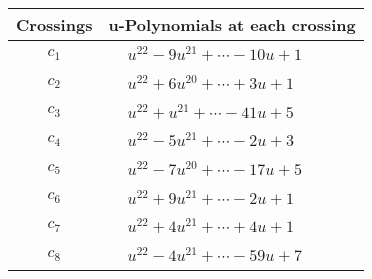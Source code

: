 \documentclass[1p]{elsarticle_modified}
\theoremstyle{definition}
\begin{document}
\begin{tabular}{m{50pt}|m{274pt}}
Crossings & \hspace{64pt}u-Polynomials at each crossing \\
\hline $$\begin{aligned}c_{1}\end{aligned}$$&$\begin{aligned}
&u^{22}-9 u^{21}+\cdots-10 u+1
\end{aligned}$\\
\hline $$\begin{aligned}c_{2}\end{aligned}$$&$\begin{aligned}
&u^{22}+6 u^{20}+\cdots+3 u+1
\end{aligned}$\\
\hline $$\begin{aligned}c_{3}\end{aligned}$$&$\begin{aligned}
&u^{22}+u^{21}+\cdots-41 u+5
\end{aligned}$\\
\hline $$\begin{aligned}c_{4}\end{aligned}$$&$\begin{aligned}
&u^{22}-5 u^{21}+\cdots-2 u+3
\end{aligned}$\\
\hline $$\begin{aligned}c_{5}\end{aligned}$$&$\begin{aligned}
&u^{22}-7 u^{20}+\cdots-17 u+5
\end{aligned}$\\
\hline $$\begin{aligned}c_{6}\end{aligned}$$&$\begin{aligned}
&u^{22}+9 u^{21}+\cdots-2 u+1
\end{aligned}$\\
\hline $$\begin{aligned}c_{7}\end{aligned}$$&$\begin{aligned}
&u^{22}+4 u^{21}+\cdots+4 u+1
\end{aligned}$\\
\hline $$\begin{aligned}c_{8}\end{aligned}$$&$\begin{aligned}
&u^{22}-4 u^{21}+\cdots-59 u+7
\end{aligned}$\\

\end{tabular}
\end{document}
